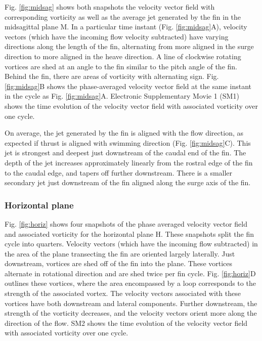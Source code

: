 \documentclass[onecolumn]{IEEEtran}
\begin{document}
Fig. \ref{fig:midsag} shows both snapshots the velocity
vector field with corresponding vorticity as well as the average
jet generated by the fin in the midsagittal plane M. In a
particular time instant (Fig. \ref{fig:midsag}A), velocity
vectors (which have the incoming flow velocity subtracted) have
varying directions along the length of the fin, alternating from
more aligned in the surge direction to more aligned in the heave
direction. A line of clockwise rotating vortices are
shed at an angle to the fin similar to the pitch angle of the
fin. Behind the fin, there are areas of vorticity with
alternating sign.  Fig. \ref{fig:midsag}B shows the 
phase-averaged velocity vector field at the same instant 
in the cycle as Fig. \ref{fig:midsag}A. Electronic Supplementary Movie 1 (SM1) shows
the time evolution of the velocity vector field with associated
vorticity over one cycle.

On average, the jet generated by the fin is aligned with the
flow direction, as expected if thrust is aligned with swimming
direction (Fig. \ref{fig:midsag}C). This jet is strongest and deepest just downstream of
the caudal end of the fin. The depth of the jet increases
approximately linearly from the rostral edge of the fin to the
caudal edge, and tapers off further downstream. There is a
smaller secondary jet just downstream of the fin aligned along
the surge axis of the fin.

\subsubsection{Horizontal plane}

Fig. \ref{fig:horiz} shows four snapshots of the phase averaged velocity vector
field and associated vorticity for the horizontal plane H. These
snapshots split the fin cycle into quarters. Velocity vectors
(which have the incoming flow subtracted) in the area of
the plane transecting the fin are oriented largely laterally.
Just downstream, vortices are shed off of the fin into the
plane. These vortices alternate in rotational direction and are
shed twice per fin cycle.  Fig. \ref{fig:horiz}D outlines these vortices, 
where the area encompassed by a loop corresponds to the strength 
of the associated vortex. The velocity vectors associated with
these vortices have both downstream and lateral components.
Further downstream, the strength of the vorticity decreases, and
the velocity vectors orient more along the direction of the
flow. SM2 shows the time evolution of the velocity vector field
with associated vorticity over one cycle.
\end{document}
